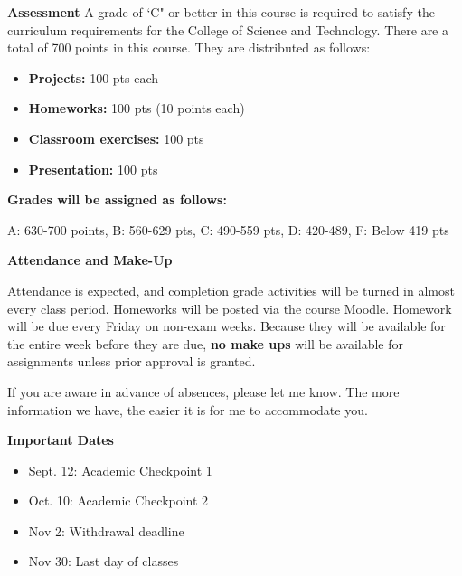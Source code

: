\documentclass[12pt]{article}
\let\oldtextbf\textbf
\renewcommand{\textbf}[1]{\textcolor{coolblack}{\oldtextbf{#1}}}
\begin{document}
\bigskip

\begin{flushleft}
\textbf{Assessment}
A grade of `C" or better in this course is required to satisfy the curriculum requirements for the College of Science and Technology. There are a total of 700 points in this course. They are distributed as follows:

\begin{itemize}
\item \textbf{Projects:} 100 pts each
\item \textbf{Homeworks:} 100 pts (10 points each)
\item \textbf{Classroom exercises:} 100 pts
\item \textbf{Presentation:} 100 pts
\end{itemize}	

\bigskip

\textbf{Grades will be assigned as follows:}

A: 630-700 points, B: 560-629 pts, C: 490-559 pts, D: 420-489, F: Below 419 pts

\end{flushleft}

\bigskip

\begin{flushleft}
\textbf{Attendance and Make-Up}
\end{flushleft}

 Attendance is expected, and completion grade activities will be turned in almost every class period. Homeworks will be posted via the course Moodle. Homework will be due every Friday on non-exam weeks. Because they will be available for the entire week before they are due, \textbf{no make ups} will be available for assignments unless prior approval is granted. \par
 If you are aware in advance of absences, please let me know. The more information we have, the easier it is for me to accommodate you. \par

\begin{flushleft}
\textbf{Important Dates}
\end{flushleft}

\begin{itemize}
\item Sept. 12: Academic Checkpoint 1	
\item Oct. 10: Academic Checkpoint 2	
\item Nov 2: Withdrawal deadline
\item Nov 30: Last day of classes

\end{itemize}
\end{document}
